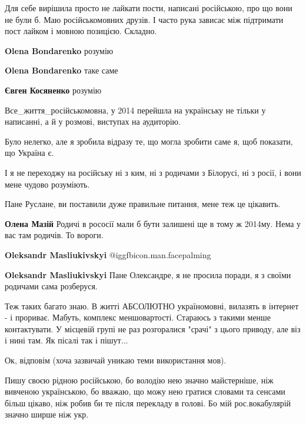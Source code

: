 \begin{itemize}

Для себе вирішила просто не лайкати пости, написані російською, про що вони не
були б. Маю російськомовних друзів. І часто рука зависає між підтримати пост
лайком і мовною позицією. Складно.

\begin{itemize} %
\textbf{Olena Bondarenko} розумію

\textbf{Olena Bondarenko} таке саме

\textbf{Євген Косяненко} розумію
\end{itemize} %


Все\_життя\_російськомовна, у 2014 перейшла на українську не тільки у написанні,
а й у розмові, виступах на аудиторію.

Було нелегко, але я зробила відразу те, що могла зробити саме я, щоб показати,
що Україна є.

І я не переходжу на російську ні з ким, ні з родичами з Білорусі, ні з росії, і
вони мене чудово розуміють.

Пане Руслане, ви поставили дуже правильне питання, мене теж це цікавить.

\begin{itemize} %
\textbf{Олена Мазій} Родичі в рососії мали б бути залишені ще в тому ж 2014му. Нема у вас там родичів. То вороги.

\textbf{Oleksandr Masliukivskyi}  @igg{fbicon.man.facepalming} 

\textbf{Oleksandr Masliukivskyi}
Пане Олександре, я не просила поради, я з своїми родичами сама розберуся.
\end{itemize} %


Теж таких багато знаю. В житті АБСОЛЮТНО україномовні, вилазять в інтернет - і
прориває. Мабуть, комплекс меншовартості. Стараюсь з такими менше контактувати.
У місцевій групі не раз розгоралися "срачі" з цього приводу, але віз і нині
там. Як пісалі так і пішут...



Ок, відповім (хоча зазвичай уникаю теми використання мов).

Пишу своєю рідною російською, бо володію нею значно майстерніше, ніж вивченою
українською, бо вважаю, що можу нею гратися словами та сенсами більш цікаво,
ніж робив би те після перекладу в голові. Бо мій рос.вокабулярій значно ширше
ніж укр.


\end{itemize}
